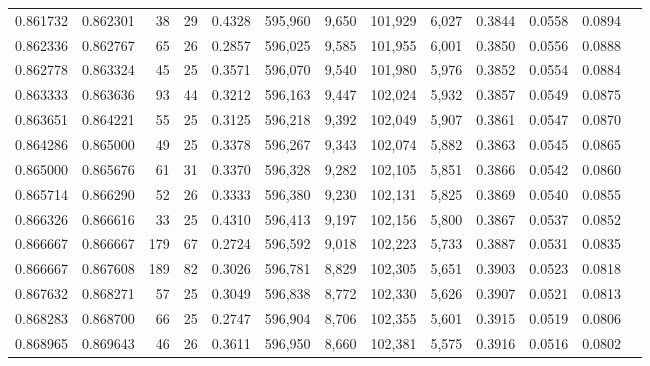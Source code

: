 \begin{tabular}{rrrrrrrrrrrrr}
0.861732 & 0.862301 &     38 &    29 &                                     0.4328 & 595,960 &   9,650 & 101,929 &   6,027 & 0.3844 & 0.0558 & 0.0894 \\
0.862336 & 0.862767 &     65 &    26 &                                     0.2857 & 596,025 &   9,585 & 101,955 &   6,001 & 0.3850 & 0.0556 & 0.0888 \\
0.862778 & 0.863324 &     45 &    25 &                                     0.3571 & 596,070 &   9,540 & 101,980 &   5,976 & 0.3852 & 0.0554 & 0.0884 \\
0.863333 & 0.863636 &     93 &    44 &                                     0.3212 & 596,163 &   9,447 & 102,024 &   5,932 & 0.3857 & 0.0549 & 0.0875 \\
0.863651 & 0.864221 &     55 &    25 &                                     0.3125 & 596,218 &   9,392 & 102,049 &   5,907 & 0.3861 & 0.0547 & 0.0870 \\
0.864286 & 0.865000 &     49 &    25 &                                     0.3378 & 596,267 &   9,343 & 102,074 &   5,882 & 0.3863 & 0.0545 & 0.0865 \\
0.865000 & 0.865676 &     61 &    31 &                                     0.3370 & 596,328 &   9,282 & 102,105 &   5,851 & 0.3866 & 0.0542 & 0.0860 \\
0.865714 & 0.866290 &     52 &    26 &                                     0.3333 & 596,380 &   9,230 & 102,131 &   5,825 & 0.3869 & 0.0540 & 0.0855 \\
0.866326 & 0.866616 &     33 &    25 &                                     0.4310 & 596,413 &   9,197 & 102,156 &   5,800 & 0.3867 & 0.0537 & 0.0852 \\
0.866667 & 0.866667 &    179 &    67 &                                     0.2724 & 596,592 &   9,018 & 102,223 &   5,733 & 0.3887 & 0.0531 & 0.0835 \\
0.866667 & 0.867608 &    189 &    82 &                                     0.3026 & 596,781 &   8,829 & 102,305 &   5,651 & 0.3903 & 0.0523 & 0.0818 \\
0.867632 & 0.868271 &     57 &    25 &                                     0.3049 & 596,838 &   8,772 & 102,330 &   5,626 & 0.3907 & 0.0521 & 0.0813 \\
0.868283 & 0.868700 &     66 &    25 &                                     0.2747 & 596,904 &   8,706 & 102,355 &   5,601 & 0.3915 & 0.0519 & 0.0806 \\
0.868965 & 0.869643 &     46 &    26 &                                     0.3611 & 596,950 &   8,660 & 102,381 &   5,575 & 0.3916 & 0.0516 & 0.0802 \\

\end{tabular}
